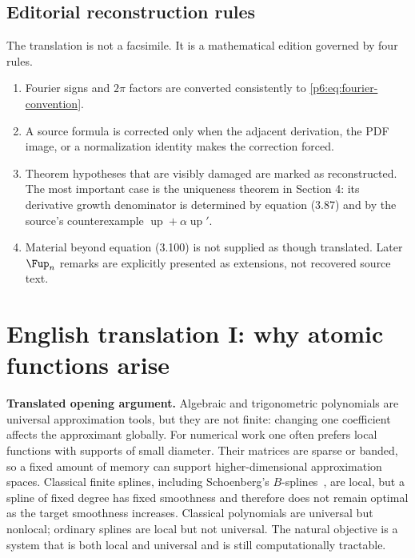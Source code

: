 \documentclass[11pt,oneside]{article}
\numberwithin{equation}{section}
\theoremstyle{definition}
\theoremstyle{remark}
\newcommand{\Up}{\operatorname{up}}
\begin{document}
\subsection{Editorial reconstruction rules}

The translation is not a facsimile.  It is a mathematical edition governed by
four rules.
\begin{enumerate}
\item Fourier signs and $2\pi$ factors are converted consistently to
\eqref{p6:eq:fourier-convention}.
\item A source formula is corrected only when the adjacent derivation, the PDF
image, or a normalization identity makes the correction forced.
\item Theorem hypotheses that are visibly damaged are marked as reconstructed.
The most important case is the uniqueness theorem in Section 4: its derivative
growth denominator is determined by equation (3.87) and by the source's
counterexample $\Up+\alpha\Up'$.
\item Material beyond equation (3.100) is not supplied as though translated.
Later $\Fup_n$ remarks are explicitly presented as extensions, not recovered
source text.
\end{enumerate}

\section{English translation I: why atomic functions arise}

\begin{sourcebox}
\textbf{Translated opening argument.}
Algebraic and trigonometric polynomials are universal approximation tools, but
they are not finite: changing one coefficient affects the approximant globally.
For numerical work one often prefers local functions with supports of small
diameter.  Their matrices are sparse or banded, so a fixed amount of memory can
support higher-dimensional approximation spaces.  Classical finite splines,
including Schoenberg's $B$-splines~\cite{p6:schoenberg}, are local, but a spline of fixed degree has
fixed smoothness and therefore does not remain optimal as the target smoothness
increases.  Classical polynomials are universal but nonlocal; ordinary splines
are local but not universal.  The natural objective is a system that is both
local and universal and is still computationally tractable.
\end{sourcebox}
\end{document}

